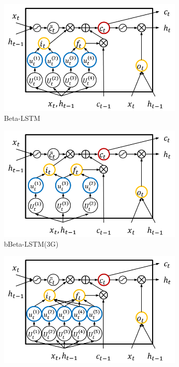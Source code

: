 \documentclass[letterpaper]{article} %
\begin{document}
\begin{figure}[t!] %
	\centering
	\begin{subfigure}{.48\columnwidth}
		\centering
		\includegraphics[width=\linewidth]{BLSTM_cell.png}
		\caption{Beta-LSTM}
	\end{subfigure}\hfil
	\begin{subfigure}{.48\columnwidth}
		\centering
		\includegraphics[width=\linewidth]{bBLSTM_3G_cell.png}
		\caption{bBeta-LSTM(3G)}
	\end{subfigure}
	\begin{subfigure}{.48\columnwidth}
		\centering
		\includegraphics[width=\linewidth]{bBLSTM_5G_cell.png}

\end{subfigure}
\end{figure}
\end{document}

